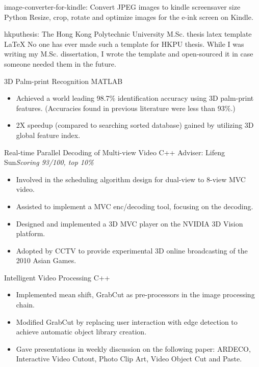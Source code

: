 \documentclass[10pt,a4paper]{moderncv/moderncv}
\begin{document}
{image-converter-for-kindle: Convert JPEG images to kindle screensaver size}
{Python}
{}{}
{
Resize, crop, rotate and optimize images for the e-ink screen on Kindle.
}

% 
{hkputhesis: The Hong Kong Polytechnic University M.Sc. thesis latex template}
{LaTeX}
{}{}
{
No one has ever made such a template for HKPU thesis. While I was writing my M.Sc. dissertation, I wrote the template and open-sourced it in case someone needed them in the future.
}

{3D Palm-print Recognition}
{MATLAB}
{}{}
{
\begin{itemize}
	\item Achieved a world leading 98.7\% identification accuracy using 3D palm-print features. (Accuracies found in previous literature were less than 93\%.)
	\item 2X speedup (compared to searching sorted database) gained by utilizing 3D global feature index.
\end{itemize}
}

{Real-time Parallel Decoding of Multi-view Video}
{C++}
{Adviser: Lifeng Sun}{\textit{Scoring 93/100, top 10\%}}
{
\begin{itemize}
	\item Involved in the scheduling algorithm design for dual-view to 8-view MVC video.
	\item Assisted to implement a MVC enc/decoding tool, focusing on the decoding.
	\item Designed and implemented a 3D MVC player on the NVIDIA 3D Vision platform.
	\item Adopted by CCTV to provide experimental 3D online broadcasting of the 2010 Asian Games.
\end{itemize}
}


{Intelligent Video Processing}
{C++}
{}{}
{
\begin{itemize}
	\item Implemented mean shift, GrabCut as pre-processors in the image processing chain.
	\item Modified GrabCut by replacing user interaction with edge detection to achieve automatic object library creation.
	\item Gave presentations in weekly discussion on the following paper: ARDECO, Interactive Video Cutout, Photo Clip Art, Video Object Cut and Paste.
\end{itemize}
}
\end{document}
